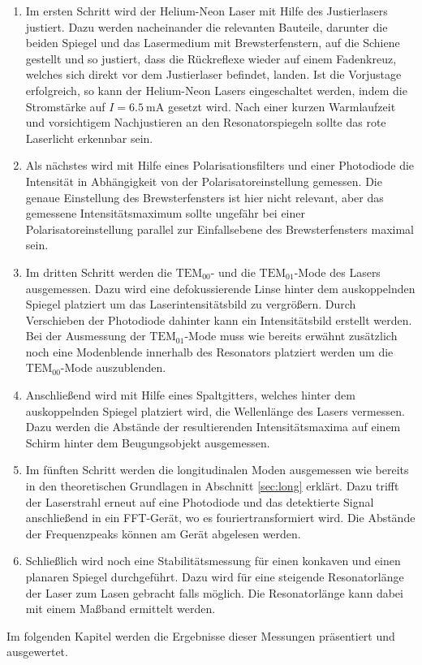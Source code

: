 \begin{enumerate}
  \item Im ersten Schritt wird der Helium-Neon Laser mit Hilfe des Justierlasers justiert.
  Dazu werden nacheinander die relevanten Bauteile, darunter die beiden Spiegel und das
  Lasermedium mit Brewsterfenstern, auf die Schiene gestellt und so justiert, dass die
  Rückreflexe wieder auf einem Fadenkreuz, welches sich direkt vor dem Justierlaser befindet,
  landen. Ist die Vorjustage erfolgreich, so kann der Helium-Neon Lasers eingeschaltet
  werden, indem die Stromstärke auf $I = \SI{6.5}{\milli\ampere}$ gesetzt wird. Nach einer
  kurzen Warmlaufzeit und vorsichtigem Nachjustieren an den Resonatorspiegeln sollte
  das rote Laserlicht erkennbar sein.
  \item Als nächstes wird mit Hilfe eines Polarisationsfilters und einer Photodiode
  die Intensität in Abhängigkeit von der Polarisatoreinstellung gemessen. Die genaue
  Einstellung des Brewsterfensters ist hier nicht relevant, aber das gemessene
  Intensitätsmaximum sollte ungefähr bei einer Polarisatoreinstellung parallel
  zur Einfallsebene des Brewsterfensters maximal sein.
  \item Im dritten Schritt werden die $\text{TEM}_{00}$- und die $\text{TEM}_{01}$-Mode des
  Lasers ausgemessen. Dazu wird eine defokussierende Linse hinter dem auskoppelnden
  Spiegel platziert um das Laserintensitätsbild zu vergrößern. Durch Verschieben der
  Photodiode dahinter kann ein Intensitätsbild erstellt werden. Bei der Ausmessung
  der $\text{TEM}_{01}$-Mode muss wie bereits erwähnt zusätzlich noch eine Modenblende
  innerhalb des Resonators platziert werden um die $\text{TEM}_{00}$-Mode auszublenden.
  \item Anschließend wird mit Hilfe eines Spaltgitters, welches hinter dem auskoppelnden
  Spiegel platziert wird, die Wellenlänge des Lasers vermessen. Dazu werden die Abstände
  der resultierenden Intensitätsmaxima auf einem Schirm hinter dem Beugungsobjekt
  ausgemessen.
  \item Im fünften Schritt werden die longitudinalen Moden ausgemessen wie bereits in
  den theoretischen Grundlagen in Abschnitt \ref{sec:long} erklärt. Dazu trifft der
  Laserstrahl erneut auf eine Photodiode und das detektierte Signal anschließend in ein
  FFT-Gerät, wo es fouriertransformiert wird. Die Abstände der Frequenzpeaks können
  am Gerät abgelesen werden.
  \item Schließlich wird noch eine Stabilitätsmessung für einen konkaven und einen planaren Spiegel
  durchgeführt. Dazu wird für eine steigende Resonatorlänge der Laser zum Lasen gebracht falls
  möglich. Die Resonatorlänge kann dabei mit einem Maßband ermittelt werden.
\end{enumerate}

Im folgenden Kapitel werden die Ergebnisse dieser Messungen präsentiert und ausgewertet.
